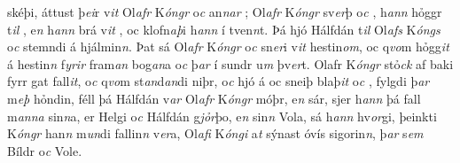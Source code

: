skéþi, áttust þ\textit{ei}r v\textit{it} Ol\textit{afr} K\textit{óngr} o\textit{c} an\textit{n}\textit{ar} ; 
Ol\textit{afr} K\textit{óngr}  sv\textit{er}þ o\textit{c} , h\textit{ann} hỏggr   t\textit{il} , e\textit{n} h\textit{ann} brá v\textit{it} , oc   klofn\textit{aþ}i   h\textit{ann} í
tven\textit{n}t. Þá hjó Hálfdán t\textit{il} Ol\textit{afs} K\textit{óngs}
o\textit{c} stemndi á hjálmin\textit{n}. 
Þat sá Ol\textit{afr} K\textit{óngr} o\textit{c} sn\textit{er}i v\textit{it} hestin\textit{om}, oc
q\textit{vo}m hỏgg\textit{it} á hestin\textit{n} f\textit{yrir} fram\textit{an} bog\textit{an}a o\textit{c} þ\textit{ar} í sundr u\textit{m} þv\textit{er}t. 
Olafr K\textit{óngr}  stỏ\textit{ck} af baki fyrr   gat fall\textit{it}, o\textit{c} q\textit{vo}m 
st\textit{an}d\textit{an}di niþr, o\textit{c} hjó á   oc  sneiþ    blaþ\textit{it} o\textit{c} , fylgdi þ\textit{ar} m\textit{eþ} hỏndin,  
féll þá Hálfdán   v\textit{ar}  Ol\textit{afr} K\textit{óngr}  móþr, e\textit{n}  sár, sjer h\textit{ann} þá fall m\textit{anna} sin\textit{n}a, er
Helgi o\textit{c} Hálfdán  g\textit{jỏr}þo, e\textit{n} sin\textit{n}  Vola, sá h\textit{ann} hv\textit{or}gi, þeinkti K\textit{óngr}  han\textit{n} m\textit{un}di fallin\textit{n} v\textit{er}a,   Ol\textit{afi} K\textit{óngi} a\textit{t} sýnast óvís sigorin\textit{n},
þ\textit{ar} s\textit{em}  
 Bíldr o\textit{c} Vole.  
\pend \endnumbering  

